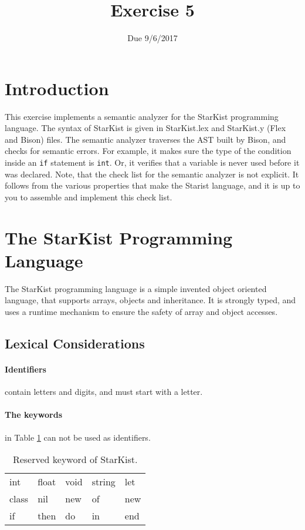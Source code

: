 \documentclass{article}
\begin{document}
\title{Exercise 5}
\date{Due 9/6/2017}
\maketitle

\section{Introduction}
This exercise implements a semantic analyzer for the StarKist
programming language.
The syntax of StarKist is given in StarKist.lex
and StarKist.y (Flex and Bison) files.
The semantic analyzer traverses the AST built by Bison,
and checks for semantic errors.
For example, it makes sure the type of the condition inside an \verb"if"
statement is \verb"int".
Or, it verifies that a variable is never used
before it was declared.
Note, that the check list for the semantic analyzer is not explicit.
It follows from the various properties that make the Starist language,
and it is up to you to assemble and implement this check list.
\section{The StarKist Programming Language}
The StarKist programming language is a simple invented object oriented language,
that supports arrays, objects and inheritance.
It is strongly typed, and uses a runtime mechanism to ensure
the safety of array and object accesses.
\subsection{Lexical Considerations}
\paragraph{Identifiers} contain letters and digits, and must start with a letter.
\paragraph{The keywords} in Table \ref{Table_Reserved_Keywords_of_StarKist} can not
be used as identifiers.
\begin{table}[h]
\centering
\begin{tabular}{ l l l l l}
  int   & float & void & string & let \\
  class & nil   & new  & of     & new \\
  if    & then  & do   & in     & end \\
\end{tabular}
\caption{
Reserved keyword of StarKist.
\label{Table_Reserved_Keywords_of_StarKist}}
\end{table}
\end{document}
